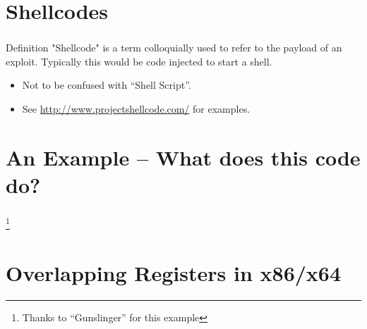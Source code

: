 \documentclass{beamer}
\begin{document}
\section{Shellcodes}
\begin{frame}
  \frametitle{\insertsection}

  \begin{block}{Definition}
  "Shellcode" is a term colloquially used to refer to the payload of an
  exploit. Typically this would be code injected to start a shell.    
  \end{block}

  \vfill

  \begin{itemize}
    \item Not to be confused with ``Shell Script''.
    \vfill
    \item See \url{http://www.projectshellcode.com/} for examples.
  \end{itemize}
\end{frame}

\section{An Example -- What does this code do?}
\begin{frame}
  \frametitle{\insertsection}

  

  \footnote{Thanks to ``Gunslinger'' for this example}

\end{frame}

\section{Overlapping Registers in x86/x64}
\end{document}
